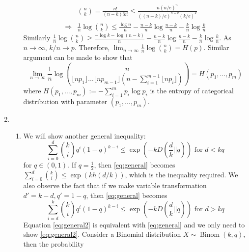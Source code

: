\documentclass{article}
\DeclareMathOperator{\Binom}{Binom}
\begin{document}
\begin{enumerate}
\begin{enumerate}
        \begin{align*}
            &\binom{n}{k} = \frac{n!}{(n-k)!k!} \leq \frac{n(n/e)^n}{((n-k)/e)^{n-k
            } (k/e)^k} \\
            \Rightarrow & \frac{1}{n}\log\binom{n}{k} 
            \leq \frac{\log n}{n} - \frac{n-k}{n} \log \frac{n-k}{n}
            -\frac{k}{n} \log \frac{k}{n}
        \end{align*}
        Similarly $\frac{1}{n}\log\binom{n}{k} \geq \frac{-\log k - \log(n-k)}{n} - \frac{n-k}{n} \log \frac{n-k}{n}
            -\frac{k}{n} \log \frac{k}{n}$.
            As $n \to \infty$, $k/n\to p$. Therefore, $\lim_{n\to \infty} \frac{1}{n} \log \binom{n}{k} = H(p)$.
            Similar argument can be made to show that
            \begin{equation*}
                \lim_{n\to \infty}\frac{1}{n}\log \binom{n}{\lfloor np_1
            \rfloor\dots \lfloor np_{m-1}
            \rfloor(n-\sum_{i=1}^{m-1} \lfloor np_i \rfloor)}
                = H(p_1, \dots, p_{m})
            \end{equation*}
            where $H(p_1, \dots, p_m):=-\sum_{i=1}^m p_i \log p_i$ is the entropy
            of categorical distribution with parameter $(p_1, \dots, p_m)$.
    \end{enumerate}
    \item
    \begin{enumerate}
        \item We will show another general inequality:
        \begin{equation}\label{eq:general}
            \sum_{i=0}^d \binom{k}{i} q^i(1-q)^{k-i}
            \leq \exp(-k D(\frac{d}{k}||q)) \textrm{ for } d < kq
        \end{equation}
        for $q\in(0,1)$.
        If $q=\frac{1}{2}$, then \eqref{eq:general} becomes
        $\sum_{i=0}^d \binom{k}{i} \leq \exp(kh(d/k))$, which is the
        inequality required. We also observe the fact that if we make
        variable transformation $d'=k-d, q'=1-q$, then \eqref{eq:general} becomes
        \begin{equation}\label{eq:general2}
            \sum_{i=d}^k \binom{k}{i} q^i(1-q)^{k-i}
            \leq \exp(-k D(\frac{d}{k}||q)) \textrm{ for } d > kq
        \end{equation}
        Equation \eqref{eq:general2} is equivalent with \eqref{eq:general}
        and we only need to show
        \eqref{eq:general2}. Consider
        a Binomial distribution $X\sim \Binom(k, q)$, then the probability

\end{enumerate}
\end{enumerate}
\end{document}
